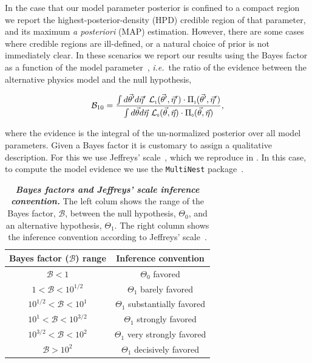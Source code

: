 In the case that our model parameter posterior is confined to a compact region we report the highest-posterior-density (HPD) credible region of that parameter, and its maximum \textit{a posteriori} (MAP) estimation.
However, there are some cases where credible regions are ill-defined, or a natural choice of prior is not immediately clear.
In these scenarios we report our results using the Bayes factor as a function of the model parameter~\cite{Trotta:2017wnx}, \textit{i.e.}\ the ratio of the evidence between the alternative physics model and the null hypothesis,
\begin{linenomath*}
	\begin{equation}
	\mathcal{B}_{1 0} = \frac{\int d\vec\theta' d\vec\eta'~\mathcal{L}_\texttt{\tiny{1}}(\vec\theta',\vec\eta')\cdot\Pi_\texttt{\tiny{1}}(\vec\theta',\vec\eta')}{\int d\vec\theta d\vec\eta~\mathcal{L}_\texttt{\tiny{0}}(\vec\theta, \vec\eta)\cdot\Pi_\texttt{\tiny{0}}(\vec\theta,\vec\eta)},
	\label{eq:bayes_factor}
	\end{equation}
\end{linenomath*}
where the evidence is the integral of the un-normalized posterior over all model parameters.
Given a Bayes factor it is customary to assign a qualitative description.
For this we use Jeffreys' scale~\cite{jeffreys1998theory}, which we reproduce in .
In this case, to compute the model evidence we use the \texttt{MultiNest} package~\cite{Feroz:2013hea}.

\begin{table}
	\begin{center}
		\begin{tabular}{c|c}
			\hline
			Bayes factor ($\mathcal{B}$) range & Inference convention \\
			\hline
			$\mathcal{B} <1$ & $\Theta_0$ favored \\
			$1<\mathcal{B}<10^{1/2}$ & $\Theta_1$ barely favored\\
			$10^{1/2}<\mathcal{B}<10^{1}$ & $\Theta_1$ substantially favored\\
			$10^{1}<\mathcal{B}<10^{3/2}$ & $\Theta_1$ strongly favored\\
			$10^{3/2}<\mathcal{B}<10^{2}$ & $\Theta_1$ very strongly favored\\
			$\mathcal{B} > 10^{2} $ & $\Theta_1$ decisively favored\\
			\hline
		\end{tabular}
	\end{center}
	\internallinenumbers
	\caption{\textit{\textbf{Bayes factors and Jeffreys' scale inference convention.}}
		The left colum shows the range of the Bayes factor, $\mathcal{B}$, between the null hypothesis, $\Theta_0$, and an alternative hypothesis, $\Theta_1$.
		The right column shows the inference convention according to Jeffreys' scale~\cite{jeffreys1998theory}.}
	\label{tbl:jeffrey}
\end{table}

